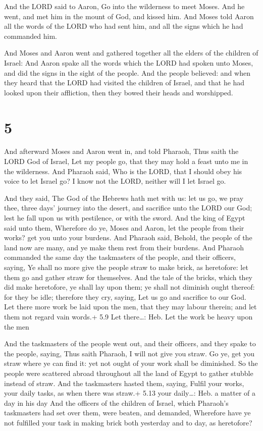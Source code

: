  And the LORD said to Aaron, Go into the wilderness to
meet Moses. And he went, and met him in the mount of God, and kissed
him.  And Moses told Aaron all the words of the LORD who
had sent him, and all the signs which he had commanded him.

 And Moses and Aaron went and gathered together all the
elders of the children of Israel:  And Aaron spake all the
words which the LORD had spoken unto Moses, and did the signs in the
sight of the people.  And the people believed: and when
they heard that the LORD had visited the children of Israel, and that he
had looked upon their affliction, then they bowed their heads and
worshipped.

\hypertarget{section-4}{%
\section{5}\label{section-4}}

 And afterward Moses and Aaron went in, and told Pharaoh,
Thus saith the LORD God of Israel, Let my people go, that they may hold
a feast unto me in the wilderness.  And Pharaoh said, Who is
the LORD, that I should obey his voice to let Israel go? I know not the
LORD, neither will I let Israel go.

 And they said, The God of the Hebrews hath met with us: let
us go, we pray thee, three days' journey into the desert, and sacrifice
unto the LORD our God; lest he fall upon us with pestilence, or with the
sword.  And the king of Egypt said unto them, Wherefore do
ye, Moses and Aaron, let the people from their works? get you unto your
burdens.  And Pharaoh said, Behold, the people of the land
now are many, and ye make them rest from their burdens.  And
Pharaoh commanded the same day the taskmasters of the people, and their
officers, saying,  Ye shall no more give the people straw to
make brick, as heretofore: let them go and gather straw for themselves.
 And the tale of the bricks, which they did make heretofore,
ye shall lay upon them; ye shall not diminish ought thereof: for they be
idle; therefore they cry, saying, Let us go and sacrifice to our God.
 Let there more work be laid upon the men, that they may
labour therein; and let them not regard vain words.+ 5.9 Let
there\ldots: Heb. Let the work be heavy upon the men

 And the taskmasters of the people went out, and their
officers, and they spake to the people, saying, Thus saith Pharaoh, I
will not give you straw.  Go ye, get you straw where ye can
find it: yet not ought of your work shall be diminished. 
So the people were scattered abroad throughout all the land of Egypt to
gather stubble instead of straw.  And the taskmasters
hasted them, saying, Fulfil your works, your daily tasks, as when there
was straw.+ 5.13 your daily\ldots: Heb. a matter of a day in his day
 And the officers of the children of Israel, which
Pharaoh's taskmasters had set over them, were beaten, and demanded,
Wherefore have ye not fulfilled your task in making brick both yesterday
and to day, as heretofore?


